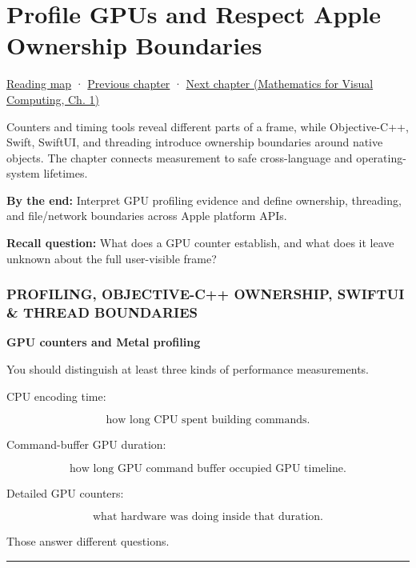 \chapter{Profile GPUs and Respect Apple Ownership Boundaries}\label{01-foundations-i-ch016-profile-gpus-and-respect-apple-ownership-boundaries}\hypertarget{01-foundations-i-ch016}{}\label{stagechapter:01-foundations-i-ch016}

\hyperref[volume-reading-map]{Reading map} · \hyperref[01-foundations-i-ch015-execute-and-measure-a-metal-frame]{Previous chapter} · \href{../02-Mathematics-for-Visual-Computing/main.pdf\#nameddest=01-foundations-i-ch017-python-and-numerical-tools-for-graphics-systems}{Next chapter (Mathematics for Visual Computing, Ch. 1)}

Counters and timing tools reveal different parts of a frame, while Objective-C++, Swift, SwiftUI, and threading introduce ownership boundaries around native objects. The chapter connects measurement to safe cross-language and operating-system lifetimes.

\textbf{By the end:} Interpret GPU profiling evidence and define ownership, threading, and file/network boundaries across Apple platform APIs.

\textbf{Recall question:} What does a GPU counter establish, and what does it leave unknown about the full user-visible frame?

\subsection{PROFILING, OBJECTIVE-C++ OWNERSHIP, SWIFTUI \& THREAD BOUNDARIES}\label{01-foundations-i-ch016-profiling-objective-c-ownership-swiftui-thread-boundaries}

\textbf{GPU counters and Metal profiling}

You should distinguish at least three kinds of performance measurements.

CPU encoding time:

\[
\text{how long CPU spent building commands}.
\]

Command-buffer GPU duration:

\[
\text{how long GPU command buffer occupied GPU timeline}.
\]

Detailed GPU counters:

\[
\text{what hardware was doing inside that duration}.
\]

Those answer different questions.

\begin{center}\rule{0.5\linewidth}{0.5pt}\end{center}

